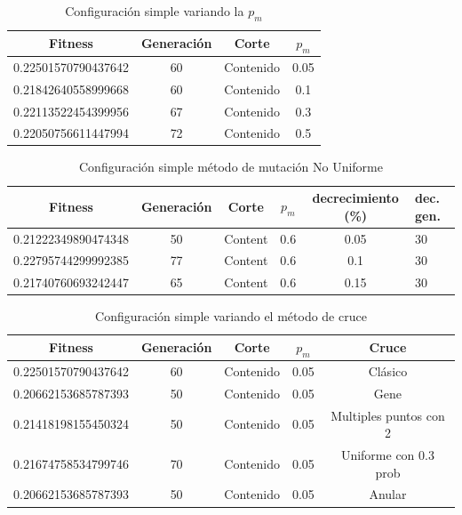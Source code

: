 \documentclass{sig-alternate}
\begin{document}
\begin{table}[htp]
	\begin{center}
	\begin{tabular}{|c|c|c|c|}
		\hline
	     Fitness & Generación & Corte & $p_{m}$ \\
		\hline
		0.22501570790437642 & 60 & Contenido & 0.05 \\
		0.21842640558999668 & 60 & Contenido & 0.1 \\
		0.22113522454399956 & 67 & Contenido & 0.3 \\ 
		0.22050756611447994 & 72 & Contenido & 0.5 \\
		\hline
	\end{tabular}
	\caption{Configuración simple variando la $p_m$}
	\label{table:simple_mutation_prob}
	\end{center}
\end{table}

\begin{table}[htp]
	\begin{center}
	\begin{tabular}{|c|c|c|c|c|p{1cm}|}
		\hline
	     Fitness & Generación & Corte & $p_{m}$ & decrecimiento (\%) & dec. gen. \\
		\hline
		0.21222349890474348 & 50 & Content & 0.6 & 0.05 & 30 \\
		0.22795744299992385 & 77 & Content & 0.6 & 0.1  & 30 \\
		0.21740760693242447 & 65 & Content & 0.6 & 0.15 & 30 \\
		\hline
	\end{tabular}
	\caption{Configuración simple método de mutación No Uniforme}
	\label{table:simple_mutation_no_uniform}
	\end{center}
\end{table}

\begin{table}[htp]
	\begin{center}
	\begin{tabular}{|c|c|c|c|c|}
		\hline
	     Fitness & Generación & Corte & $p_{m}$ & Cruce \\
		\hline
		0.22501570790437642 & 60 & Contenido & 0.05 & Clásico \\
		0.20662153685787393 & 50 & Contenido & 0.05 & Gene \\
		0.21418198155450324 & 50 & Contenido & 0.05 & Multiples puntos con 2 \\
		0.21674758534799746 & 70 & Contenido & 0.05 & Uniforme con 0.3 prob \\
		0.20662153685787393 & 50 & Contenido & 0.05 & Anular \\
		\hline
	\end{tabular}
	\caption{Configuración simple variando el método de cruce}
	\label{table:crossover}
	\end{center}
\end{table}
\end{document}
